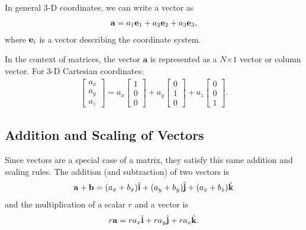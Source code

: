 %

In general 3-D coordinates, we can write a vector as
\begin{align}
  \mathbf{a} = a_1 \mathbf{e}_1 + a_2 \mathbf{e}_2 + a_3 \mathbf{e}_3,
\end{align}
where $\mathbf{e}_i$ is a vector describing the coordinate system.

In the context of matrices, the vector $\mathbf{a}$ is represented as a $N$$\times$$1$ vector or column vector. For 3-D Cartesian coordinates:
\begin{align}
  \left[ \begin{array}{c} a_x \\ a_y \\ a_z \end{array} \right] 
  = a_x \left[ \begin{array}{c} 1 \\ 0 \\ 0 \end{array} \right] 
  + a_y \left[ \begin{array}{c} 0 \\ 1 \\ 0 \end{array} \right] 
  + a_z \left[ \begin{array}{c} 0 \\ 0 \\ 1 \end{array} \right] .
\end{align}

\subsection{Addition and Scaling of Vectors}

Since vectors are a special case of a matrix, they satisfy this same addition and scaling rules. The addition (and subtraction) of two vectors is
\begin{align}
  \mathbf{a} + \mathbf{b} = ( a_x + b_x ) \hat{\mathbf{i}} + ( a_y + b_y ) \hat{\mathbf{j}} + ( a_z + b_z ) \hat{\mathbf{k}}
\end{align}
and the multiplication of a scalar $r$ and a vector is
\begin{align}
  r \mathbf{a} = r a_x \hat{\mathbf{i}} + r a_y \hat{\mathbf{j}} + r a_z \hat{\mathbf{k}}.
\end{align}



